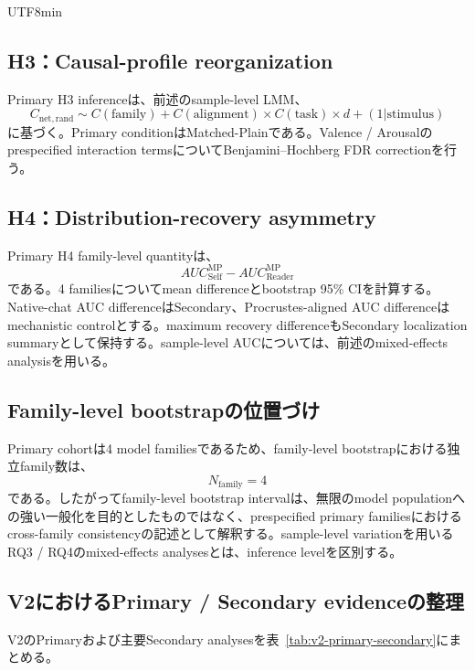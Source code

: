 \documentclass{article} %
\begin{document}
\begin{CJK*}{UTF8}{min}
\subsection{H3：Causal-profile reorganization}

Primary H3 inferenceは、前述のsample-level LMM、
\[
C_{\mathrm{net,rand}}
\sim
C(\mathrm{family})
+
C(\mathrm{alignment})
\times
C(\mathrm{task})
\times
d
+
(1|\mathrm{stimulus})
\]
に基づく。Primary conditionはMatched-Plainである。Valence / Arousalのprespecified interaction termsについてBenjamini--Hochberg FDR correctionを行う。


\subsection{H4：Distribution-recovery asymmetry}

Primary H4 family-level quantityは、
\[
AUC_{\mathrm{Self}}^{\mathrm{MP}}
-
AUC_{\mathrm{Reader}}^{\mathrm{MP}}
\]
である。4 familiesについてmean differenceとbootstrap 95\% CIを計算する。Native-chat AUC differenceはSecondary、Procrustes-aligned AUC differenceはmechanistic controlとする。maximum recovery differenceもSecondary localization summaryとして保持する。sample-level AUCについては、前述のmixed-effects analysisを用いる。


\subsection{Family-level bootstrapの位置づけ}

Primary cohortは4 model familiesであるため、family-level bootstrapにおける独立family数は、
\[
N_{\mathrm{family}}=4
\]
である。したがってfamily-level bootstrap intervalは、無限のmodel populationへの強い一般化を目的としたものではなく、prespecified primary familiesにおけるcross-family consistencyの記述として解釈する。sample-level variationを用いるRQ3 / RQ4のmixed-effects analysesとは、inference levelを区別する。


\subsection{V2におけるPrimary / Secondary evidenceの整理}

V2のPrimaryおよび主要Secondary analysesを表~\ref{tab:v2-primary-secondary}にまとめる。


\end{CJK*}
\end{document}
